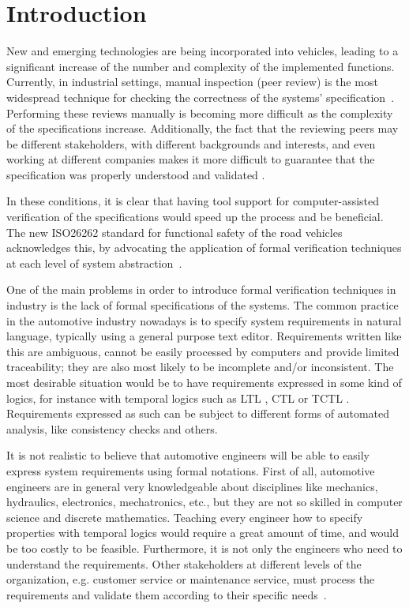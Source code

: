 \documentclass[conference]{IEEEtran}
\begin{document}
\section{Introduction}

New and emerging technologies are being incorporated into vehicles, leading to a significant increase of the number and complexity of the implemented functions. Currently, in industrial settings, manual inspection (peer review) is the most widespread technique for checking the correctness of the systems' specification~\cite{Walia09sysLitReview}. Performing these reviews manually is becoming more difficult as the complexity of the specifications increase. Additionally, the fact that the reviewing peers may be different stakeholders, with different backgrounds and interests, and even working at different companies makes it more difficult to guarantee that the specification was properly understood and validated \cite{Heumesser92experienceInAutomotive}. 

In these conditions, it is clear that having tool support for computer-assisted verification of the specifications would speed up the process and be beneficial. The new ISO26262 standard for functional safety of the road vehicles acknowledges this, by advocating the application of formal verification techniques at each level of system abstraction~\cite{iso26262}. 

One of the main problems in order to introduce formal verification techniques in industry is the lack of formal specifications of the systems. The common practice in the automotive industry nowadays is to specify system requirements in natural language, typically using a general purpose text editor. Requirements written like this are ambiguous, cannot be easily processed by computers and provide limited traceability; they are also most likely to be incomplete and/or inconsistent. The most desirable situation would be to have requirements expressed in some kind of logics, for instance with temporal logics such as LTL \cite{Emerson95temporaland}, CTL \cite{Emerson95temporaland} or TCTL \cite{Alur92phd}. Requirements expressed as such can be subject to different forms of automated analysis, like consistency checks and others.

It is not realistic to believe that automotive engineers will be able to easily express system requirements using formal notations. First of all, automotive engineers are in general very knowledgeable about disciplines like mechanics, hydraulics, electronics, mechatronics, etc., but they are not so skilled in computer science and discrete mathematics. Teaching every engineer how to specify properties with temporal logics would require a great amount of time, and would be too costly to be feasible.
Furthermore, it is not only the engineers who need to understand the requirements. Other stakeholders at different levels of the organization, e.g. customer service or maintenance service, must process the requirements and validate them according to their specific needs~\cite{Hull11reBook}.
\end{document}
